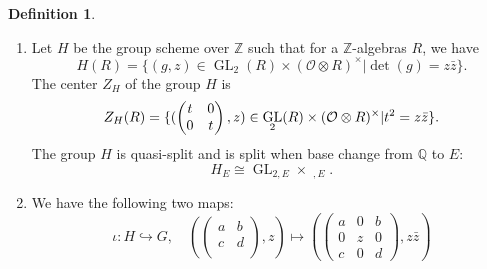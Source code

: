 \documentclass[11pt, a4paper]{amsart}
\theoremstyle{plain}
\theoremstyle{definition}
\newtheorem{definition}[theorem]{Definition}
\numberwithin{equation}{section}
\def\QQ{\mathbb{Q}}
\def\ZZ{\mathbb{Z}}
\DeclareMathOperator{\GL}{\mathrm{GL}}
\DeclareMathOperator{\Gm}{\mathrm{G_{m}}}
\begin{document}
\begin{definition}
\begin{enumerate}
\begin{equation*}
        \end{equation*}
        We define $G_{0} = \ker(\mu)$ as the unitary group. Hence, we have 
        \begin{equation*}
            G(R) = Z_{G}(R) G_{0}(R),
        \end{equation*}
        for all $\mathbb{Z}$-algebras $R$. 
        Note that $G$ is reductive over $\ZZ_{l}$ for $l \nmid D$ (even for $l = 2$). 
    \item Let $H$ be the group scheme over $\mathbb{Z}$ such that for a $\mathbb{Z}$-algebras $R$, we have 
        \[
            H(R) = \{ (g,z) \in \GL_2(R) \times (\mathcal{O} \otimes R)^{\times} | \det(g) = z\bar{z} \}. 
        \]
        The center $Z_{H}$ of the group $H$ is 
        \begin{equation}
        \label{eq: Z_{H}}
            Z_{H}(R) = \{ (\begin{pmatrix}
                               t & 0 \\
                               0 & t 
                           \end{pmatrix}, z) \in \GL_2(R) \times (\mathcal{O} \otimes R)^{\times} | t^{2} = z\bar{z}\}. 
        \end{equation}
        The group $H$ is quasi-split and is split when base change from $\QQ$ to $E$: 
        \begin{equation*}
            H_{E} \cong \GL_{2, E} \times \Gm_{, E}. 
        \end{equation*}
    \item We have the following two maps:
            \[
                \iota \colon H \hookrightarrow G,  \quad (\begin{pmatrix} 
                                                        a & b \\
                                                        c & d \\
                                                     \end{pmatrix}, z) \mapsto (\begin{pmatrix}
                                                                                    a & 0 & b \\
                                                                                    0 & z & 0 \\
                                                                                    c & 0 & d 
                                                                                 \end{pmatrix}, z\bar{z})
\]
\end{enumerate}
\end{definition}
\end{document}
